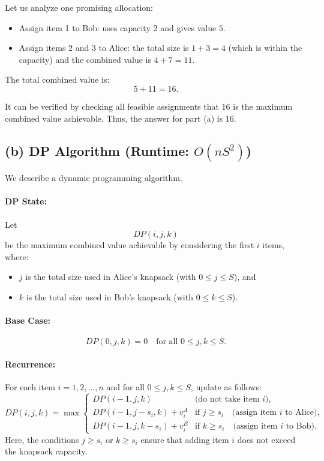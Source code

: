 \documentclass[11pt]{article}
\begin{document}
    Let us analyze one promising allocation:
    \begin{itemize}
        \item Assign item 1 to Bob: uses capacity \(2\) and gives value \(5\).
        \item Assign items 2 and 3 to Alice: the total size is \(1+3=4\) (which is within the capacity) and the combined value is \(4+7=11\).
    \end{itemize}
    The total combined value is:
    \[
    5 + 11 = 16.
    \]
    
    It can be verified by checking all feasible assignments that \(16\) is the maximum combined value achievable. Thus, the answer for part (a) is \(\boxed{16}\).
    
    \subsection*{(b) DP Algorithm (Runtime: \(O(nS^2)\))}
    
    We describe a dynamic programming algorithm.
    
    \paragraph{DP State:} Let 
    \[
    DP(i,j,k)
    \]
    be the maximum combined value achievable by considering the first \(i\) items, where:
    \begin{itemize}
        \item \(j\) is the total size used in Alice's knapsack (with \(0\le j\le S\)), and
        \item \(k\) is the total size used in Bob's knapsack (with \(0\le k\le S\)).
    \end{itemize}
    
    \paragraph{Base Case:}
    \[
    DP(0,j,k) = 0 \quad \text{for all } 0\le j,k \le S.
    \]
    
    \paragraph{Recurrence:} For each item \(i=1,2,\ldots,n\) and for all \(0\le j,k\le S\), update as follows:
    \[
    DP(i,j,k) = \max \begin{cases}
    DP(i-1, j, k) & \text{(do not take item } i\text{)}, \\[1mm]
    DP(i-1, j-s_i, k) + v_i^A & \text{if } j \ge s_i \quad \text{(assign item } i \text{ to Alice)}, \\[1mm]
    DP(i-1, j, k-s_i) + v_i^B & \text{if } k \ge s_i \quad \text{(assign item } i \text{ to Bob)}.
    \end{cases}
    \]
    Here, the conditions \(j\ge s_i\) or \(k\ge s_i\) ensure that adding item \(i\) does not exceed the knapsack capacity.
    
\end{document}
